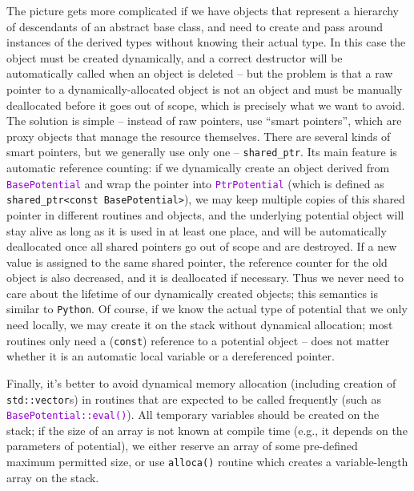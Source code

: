 \documentclass[12pt]{article}
\newcommand{\Python}{\texttt{Python}\xspace}
\newcommand{\ttt}[1]{\textcolor{darkviolet}{\texttt{#1}}}
\begin{document}
\label{sec:SmartPointers}
The picture gets more complicated if we have objects that represent a hierarchy of descendants of an abstract base class, and need to create and pass around instances of the derived types without knowing their actual type. In this case the object must be created dynamically, and a correct destructor will be automatically called when an object is deleted -- but the problem is that a raw pointer to a dynamically-allocated object is not an object and must be manually deallocated before it goes out of scope, which is precisely what we want to avoid. The solution is simple -- instead of raw pointers, use ``smart pointers'', which are proxy objects that manage the resource themselves. There are several kinds of smart pointers, but we generally use only one -- \texttt{shared_ptr}. Its main feature is automatic reference counting: if we dynamically create an object derived from \ttt{BasePotential} and wrap the pointer into \ttt{PtrPotential} (which is defined as \texttt{shared_ptr<const BasePotential>}), we may keep multiple copies of this shared pointer in different routines and objects, and the underlying potential object will stay alive as long as it is used in at least one place, and will be automatically deallocated once all shared pointers go out of scope and are destroyed. If a new value is assigned to the same shared pointer, the reference counter for the old object is also decreased, and it is deallocated if necessary. Thus we never need to care about the lifetime of our dynamically created objects; this semantics is similar to \Python.
Of course, if we know the actual type of potential that we only need locally, we may create it on the stack without dynamical allocation; most routines only need a (\texttt{const}) reference to a potential object -- does not matter whether it is an automatic local variable or a dereferenced pointer.

Finally, it's better to avoid dynamical memory allocation (including creation of \texttt{std::vector}s) in routines that are expected to be called frequently (such as \ttt{BasePotential::eval()}). All temporary variables should be created on the stack; if the size of an array is not known at compile time (e.g., it depends on the parameters of potential), we either reserve an array of some pre-defined maximum permitted size, or use \texttt{alloca()} routine which creates a variable-length array on the stack.
\end{document}
